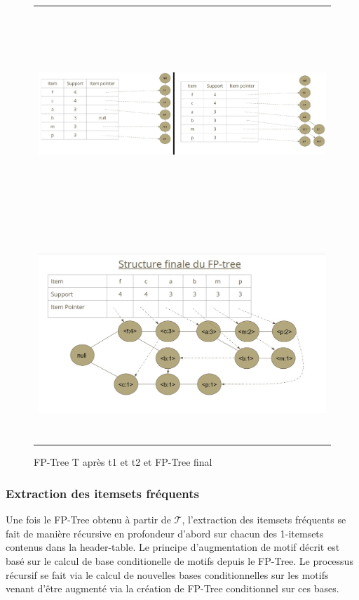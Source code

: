 \documentclass[a4paper,10pt]{report}
\begin{document}
\begin{figure}
	\begin{adjustwidth}{-4cm}{}
	\begin{tabular}{l}
	\includegraphics[width=20cm,height=8cm]{./img/t1.jpg}\\
	\includegraphics[width=20cm,height=8cm]{./img/fp_tree.jpg}\\
	\end{tabular}
	\caption{\label{fig:text}FP-Tree T après t1 et t2 et FP-Tree final}
	\end{adjustwidth}
\end{figure}

\newpage
\subsubsection{Extraction des itemsets fréquents}
\hspace{0.15cm}Une fois le FP-Tree obtenu à partir de $\mathcal{T}$, l'extraction des itemsets fréquents se fait de manière récursive en profondeur d'abord sur chacun des 1-itemsets contenus dans la header-table. Le principe d'augmentation de motif décrit est basé sur le calcul de base conditionelle de motifs depuis le FP-Tree. Le processus récursif se fait via le calcul de nouvelles bases conditionnelles sur les motifs venant d'être augmenté via la création de FP-Tree conditionnel sur ces bases. \\
\end{document}

